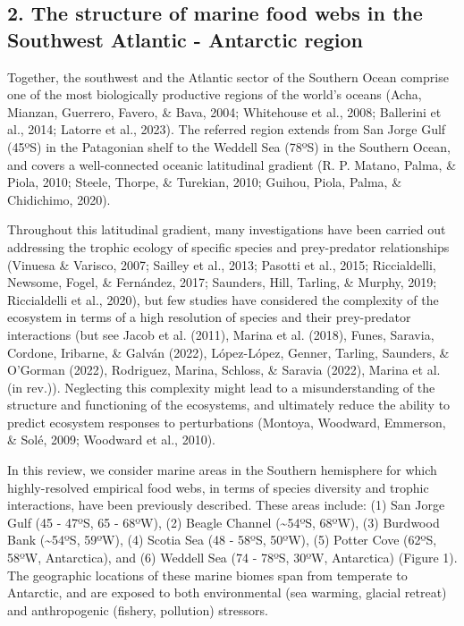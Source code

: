 \documentclass[
]{article}
\begin{document}
\hypertarget{the-structure-of-marine-food-webs-in-the-southwest-atlantic---antarctic-region}{%
\subsection{2. The structure of marine food webs in the Southwest
Atlantic - Antarctic
region}\label{the-structure-of-marine-food-webs-in-the-southwest-atlantic---antarctic-region}}

Together, the southwest and the Atlantic sector of the Southern Ocean
comprise one of the most biologically productive regions of the world's
oceans (Acha, Mianzan, Guerrero, Favero, \& Bava, 2004; Whitehouse et
al., 2008; Ballerini et al., 2014; Latorre et al., 2023). The referred
region extends from San Jorge Gulf (45ºS) in the Patagonian shelf to the
Weddell Sea (78ºS) in the Southern Ocean, and covers a well-connected
oceanic latitudinal gradient (R. P. Matano, Palma, \& Piola, 2010;
Steele, Thorpe, \& Turekian, 2010; Guihou, Piola, Palma, \& Chidichimo,
2020).

Throughout this latitudinal gradient, many investigations have been
carried out addressing the trophic ecology of specific species and
prey-predator relationships (Vinuesa \& Varisco, 2007; Sailley et al.,
2013; Pasotti et al., 2015; Riccialdelli, Newsome, Fogel, \& Fernández,
2017; Saunders, Hill, Tarling, \& Murphy, 2019; Riccialdelli et al.,
2020), but few studies have considered the complexity of the ecosystem
in terms of a high resolution of species and their prey-predator
interactions (but see Jacob et al. (2011), Marina et al. (2018), Funes,
Saravia, Cordone, Iribarne, \& Galván (2022), López-López, Genner,
Tarling, Saunders, \& O'Gorman (2022), Rodriguez, Marina, Schloss, \&
Saravia (2022), Marina et al. (in rev.)). Neglecting this complexity
might lead to a misunderstanding of the structure and functioning of the
ecosystems, and ultimately reduce the ability to predict ecosystem
responses to perturbations (Montoya, Woodward, Emmerson, \& Solé, 2009;
Woodward et al., 2010).

In this review, we consider marine areas in the Southern hemisphere for
which highly-resolved empirical food webs, in terms of species diversity
and trophic interactions, have been previously described. These areas
include: (1) San Jorge Gulf (45 - 47ºS, 65 - 68ºW), (2) Beagle Channel
(\textasciitilde54ºS, 68ºW), (3) Burdwood Bank (\textasciitilde54ºS,
59ºW), (4) Scotia Sea (48 - 58ºS, 50ºW), (5) Potter Cove (62ºS, 58ºW,
Antarctica), and (6) Weddell Sea (74 - 78ºS, 30ºW, Antarctica) (Figure
1). The geographic locations of these marine biomes span from temperate
to Antarctic, and are exposed to both environmental (sea warming,
glacial retreat) and anthropogenic (fishery, pollution) stressors.
\end{document}
